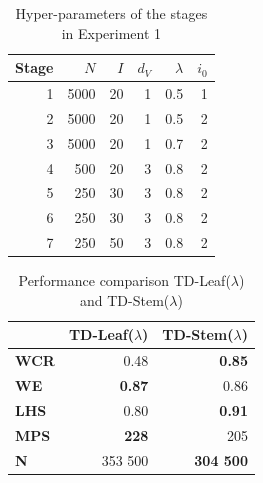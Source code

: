 \begin{table}[]
\centering
\caption{Hyper-parameters of the stages in Experiment 1}
\label{tab:exp1}
\begin{tabular}{r|rrrrr}
\textbf{Stage} & \textbf{$N$}  & \textbf{$I$} & \textbf{$d_V$} & \textbf{$\lambda$}& \textbf{$i_0$} \\ \hline
1     & 5000 & 20  & 1     & 0.5  & 1     \\
2     & 5000 & 20  & 1     & 0.5  & 2     \\
3     & 5000 & 20  & 1     & 0.7  & 2     \\
4     & 500  & 20  & 3     & 0.8  & 2     \\
5     & 250  & 30  & 3     & 0.8  & 2     \\
6     & 250  & 30  & 3     & 0.8  & 2     \\
7     & 250  & 50  & 3     & 0.8  & 2    
\end{tabular}
\end{table}

\begin{table}[]
\centering
\caption{Performance comparison TD-Leaf($\lambda$) and TD-Stem($\lambda$)}
\label{tab:perf_krk}
\begin{tabular}{l|rr}
    & \multicolumn{1}{l}{\textbf{TD-Leaf($\lambda$)}} & \multicolumn{1}{l}{\textbf{TD-Stem($\lambda$)}} \\ \hline
\textbf{WCR} & 0.48                                   & \textbf{0.85}                          \\
\textbf{WE}  & \textbf{0.87}                          & 0.86                                   \\
\textbf{LHS} & 0.80                                   & \textbf{0.91}                          \\
\textbf{MPS} & \textbf{228}                           & 205                                    \\
\textbf{N }  & 353 500                                & \textbf{304 500}                      
\end{tabular}
\end{table}

